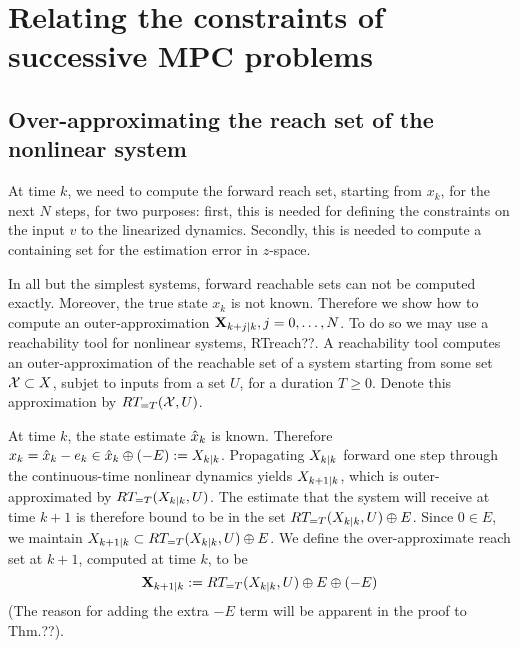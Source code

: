 \section{Relating the constraints of successive MPC problems}
\label{sec:set inclusions}




 \subsection{Over-approximating the reach set of the nonlinear system}
\label{sec:x reach}

At time $k$, we need to compute the forward reach set, starting from $x_k$, for the next $N$ steps, for two purposes:
first, this is needed for defining the constraints on the input $v$ to the linearized dynamics.
Secondly, this is needed to compute a containing set for the estimation error in $z$-space.

In all but the simplest systems, forward reachable sets can not be computed exactly.
Moreover, the true state $x_k$ is not known.
Therefore we show how to compute an outer-approximation $\mathbf{X}_{k+j|k},  j=0,\ldots, N$.
To do so we may use a reachability tool for nonlinear systems, RTreach??. 
A reachability tool computes an outer-approximation of the reachable set of a system starting from some set $\mathcal{X} \subset X$, subjet to inputs from a set $U$, for a duration $T \geq 0$. 
Denote this approximation by $RT_{=T}(\mathcal{X},U)$.

At time $k$, the state estimate $\hat{x}_{k}$ is known.
Therefore $x_k = \hat{x}_{k} - e_k \in \hat{x}_{k} \oplus (-E) := X_{k|k}$.
Propagating $X_{k|k}$ forward one step through the continuous-time nonlinear dynamics yields $X_{k+1|k}$, which is outer-approximated by $RT_{=T}(X_{k|k},U)$.
The estimate that the system will receive at time $k+1$ is therefore bound to be in the set $RT_{=T}(X_{k|k},U)  \oplus E$.
Since $0 \in E$, we maintain $X_{k+1|k} \subset RT_{=T}(X_{k|k},U)  \oplus E$.
We define the over-approximate reach set at $k+1$, computed at time $k$, to be 
\begin{equation*}
\label{eq:def Xk}
\mathbf{X}_{k+1|k} :=  RT_{=T}(X_{k|k},U)  \oplus E \oplus  (-E)
\end{equation*}
(The reason for adding the extra $-E$ term will be apparent in the proof to Thm.??).

